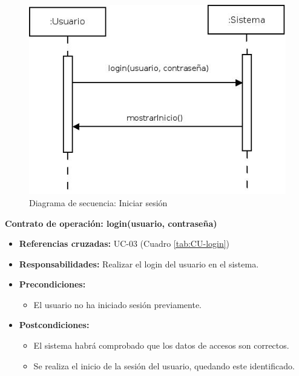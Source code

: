 \begin{figure}[h!]
\centering
  \includegraphics[scale=.55]{img/secuencias/gestion-usuarios-login.jpeg}
  \caption{Diagrama de secuencia: Iniciar sesión}
  \label{fig:secuencia-gestion-usuarios-login}
\end{figure}


\textbf{Contrato de operación: login(usuario, contraseña)}
\begin{itemize}
\item \textbf{Referencias cruzadas:} UC-03 (Cuadro \ref{tab:CU-login})
\item \textbf{Responsabilidades:} Realizar el login del usuario en el sistema.
\item \textbf{Precondiciones:} 
 \begin{itemize}
\item El usuario no ha iniciado sesión previamente.
\end {itemize}
\item \textbf{Postcondiciones:} 
 \begin{itemize}
\item El sistema habrá comprobado que los datos de accesos son correctos.
\item Se realiza el inicio de la sesión del usuario, quedando este identificado.
\end {itemize}
\end {itemize}

